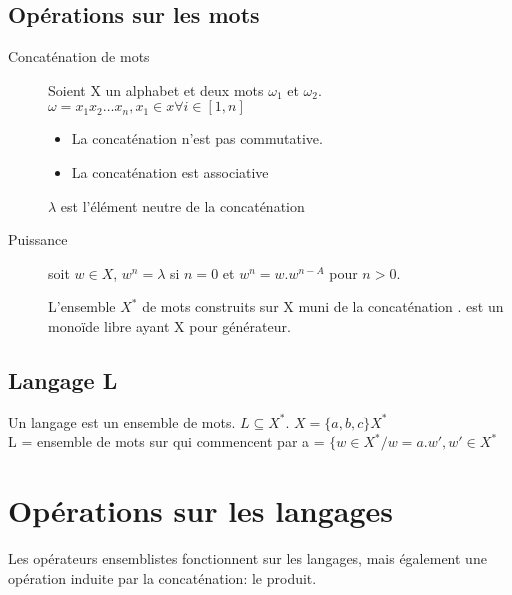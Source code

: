 	\subsection{Opérations sur les mots}
	\begin{description}
		\item[Concaténation de mots] Soient X un alphabet et deux mots $\omega_1$ et $\omega_2$.\\
			$\omega = x_1x_2\ldots x_n, x_1 \in x \forall i\in[1,n]$
			\begin{attention}
				\begin{itemize}
					\item La concaténation n'est pas commutative.	
					\item La concaténation est associative
				\end{itemize}
			\end{attention}
			\begin{remarque}
				$\lambda$ est l'élément neutre de la concaténation
				\\
			\end{remarque}
		\item[Puissance] soit $w \in X$, $w^n = \lambda$ si $n=0$ et $w^n = w.w^{n-A}$ pour $n > 0$.
			\begin{remarque}
				L'ensemble $X^{*}$ de mots construits sur X muni de la concaténation $.$ est un monoïde libre ayant X pour générateur.
			\end{remarque}
	\end{description}
	\subsection{Langage L}
	Un langage est un ensemble de mots. $L \subseteq X^*$. $X=\{a,b,c\} X^*$\\
	L = ensemble de mots sur  qui commencent par a = $\{w \in X^* / w = a.w', w'\in X^*$
	\section{Opérations sur les langages}
	Les opérateurs ensemblistes fonctionnent sur les langages, mais également une opération induite par la concaténation: le produit.
	
